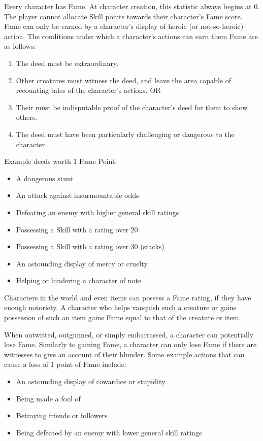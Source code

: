 \documentclass[oneside]{book}
\begin{document}
\begin{multicols}{2}
Every character has Fame. At character creation, this statistic always begins at 0. The player cannot allocate Skill points towards their character's Fame score. Fame can only be earned by a character's display of heroic (or not-so-heroic) action. The conditions under which a character's actions can earn them Fame are as follows:
	
	\begin{enumerate}
		\item{ \small The deed must be extraordinary.}
		\item{ \small Other creatures must witness the deed, and leave the area capable of recounting tales of the character's actions. OR}
		\item{ \small Their must be indisputable proof of the character's deed for them to show others.}
		\item{ \small The deed must have been particularly challenging or dangerous to the character.}
\end{enumerate}

Example deeds worth 1 Fame Point:
\begin{itemize}
\setlength\itemsep{0em}
\item{ \small A dangerous stunt}
\item{ \small An attack against insurmountable odds}
\item{ \small Defeating an enemy with higher general skill ratings}
\item{ \small Possessing a Skill with a rating over 20}
\item{ \small Possessing a Skill with a rating over 30 (stacks)}
\item{ \small An astounding display of mercy or cruelty}
\item{ \small Helping or hindering a character of note}
\end{itemize}

Characters in the world and even items can possess a Fame rating, if they have enough notoriety. A character who helps vanquish such a creature or gains possession of such an item gains Fame equal to that of the creature or item.

When outwitted, outgunned, or simply embarrassed, a character can potentially lose Fame. Similarly to gaining Fame, a character can only lose Fame if there are witnesses to give an account of their blunder. Some example actions that can cause a loss of 1 point of Fame include:
\begin{itemize}
\setlength\itemsep{0em}
\item{ \small An astounding display of cowardice or stupidity}
\item{ \small Being made a fool of}
\item{ \small Betraying friends or followers}
\item{ \small Being defeated by an enemy with lower general skill ratings}
\end{itemize}


\end{multicols}
\end{document}
